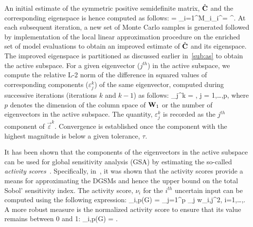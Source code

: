 An initial estimate of the symmetric positive semidefinite matrix, $\hat{\mathbf{{C}}}$ 
and the corresponding eigenspace is hence computed as follows:
%
\be
{} = \sum\limits_{i=1}^{M}_i_i^\top = \hat{\bm{\Lambda}}^\top.
\ee
%
At each subsequent iteration, a new set of Monte Carlo samples is generated followed by implementation of the
 local linear approximation procedure on the enriched set of model evaluations to obtain an improved estimate of
 $\hat{\mathbf{{C}}}$ and its eigenspace. The improved eigenspace is partitioned as discussed earlier in~\ref{sub:as}
 to obtain the active subspace. For a given eigenvector ($j^{th}$) in the active subspace, 
 we compute the relative L-2 
 norm of the difference in squared values of corresponding components ($\varepsilon_j^k$) of the same eigenvector,
 computed during successive iterations (iterations $k$ and $k-1$) as follows:
%
\be
\varepsilon_j^k = , 
                       j = 1,\ldots,p,
\label{eq:conv}
\ee
%
where $p$ denotes the dimension of the column space of $\mathbf{{W}}_1$ or the number of eigenvectors in
the active subspace.
The quantity, $\varepsilon_j^k$ is recorded as the $j^{th}$ component of $\vec\varepsilon^k$. Convergence is
established once the component with the highest magnitude is below a given tolerance, $\tau$.

It has been shown that the components of the eigenvectors in the active subspace can be used for global
sensitivity analysis (GSA) by estimating the so-called 
\textit{activity scores}~\cite{Diaz:2016,Constantine:2017,Vohra:2018c}. Specifically, in~\cite{Vohra:2018c},
it was shown that the activity scores provide a means for approximating the DGSMs and hence the upper bound
on the total Sobol' sensitivity index. The activity score, $\nu_i$ for the $i^{th}$ uncertain
input can be computed using the following expression:
%
\be
\nu_{i,p}(G) = \sum\limits_{j=1}^{p} \Lambda_j w_{i,j}^2, i=1,\ldots,\Nt.
\label{eq:ac}
\ee
%
A more robust measure is the normalized activity score to ensure
that its value remains between 0 and 1:
%
\be
\tilde{\nu}_{i,p}(G) = .
\label{eq:nac}
\ee
%

